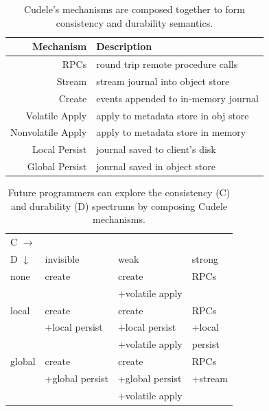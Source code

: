 \begin{table}
\begin{tabular}{ r | l }
  Mechanism         & Description \\\hline
  RPCs              & round trip remote procedure calls \\
  Stream            & stream journal into object store \\
  Create            & events appended to in-memory journal \\
  Volatile Apply    & apply to metadata store in obj store \\
  Nonvolatile Apply & apply to metadata store in memory \\
  Local Persist     & journal saved to client's disk \\
  Global Persist    & journal saved in object store \\
\end{tabular}
\caption{Cudele's mechanisms are composed together to form consistency and
durability semantics.\label{table:mechanisms}} 
\end{table}

\begin{table}[t]
\begin{center}
\begin{tabular}{ l | l | l | l }
  C \(\rightarrow\) &&& \\  
  D \(\downarrow\)  	     & invisible         & weak        & strong  \\\hline
  none                       & create            & create          & RPCs    \\
                             &                   & +volatile apply &         \\\hdashline
  local                      & create            & create          & RPCs    \\
                             & +local persist    & +local persist  & +local  \\
                             &                   & +volatile apply &  persist\\\hdashline
  global                     & create            & create          & RPCs    \\
                             & +global persist   & +global persist & +stream \\
                             &                   & +volatile apply &         \\
\end{tabular}

\caption{Future programmers can explore the consistency (C) and
durability (D) spectrums by composing Cudele mechanisms. 
\label{table:spectrum}}
\end{center}
\end{table}

